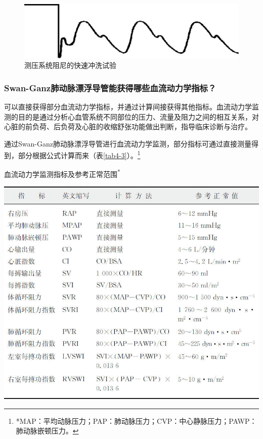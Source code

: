 \begin{figure}[!htbp]
 \centering
 \includegraphics{./images/Image00037.jpg}
 \captionsetup{justification=centering}
 \caption{测压系统阻尼的快速冲洗试验}
 \label{fig4-8}
  \end{figure} 

\subsubsection{Swan-Ganz肺动脉漂浮导管能获得哪些血流动力学指标？}

可以直接获得部分血流动力学指标，并通过计算间接获得其他指标。血流动力学监测的目的是通过分析心血管系统不同部位的压力、流量及阻力之间的相互关系，对心脏的前负荷、后负荷及心脏的收缩舒张功能做出判断，指导临床诊断与治疗。

通过Swan-Ganz肺动脉漂浮导管进行血流动力学监测，部分指标可通过直接测量得到，部分根据公式计算而来（表\ref{tab4-3}）。\footnote{*MAP：平均动脉压力；PAP：肺动脉压力；CVP：中心静脉压力；PAWP：肺动脉嵌顿压力。}

\begin{table}[htbp]
\centering
\caption{血流动力学监测指标及参考正常范围\textsuperscript{*}}
\label{tab4-3}
\includegraphics{./images/Image00038.jpg}
\end{table}


